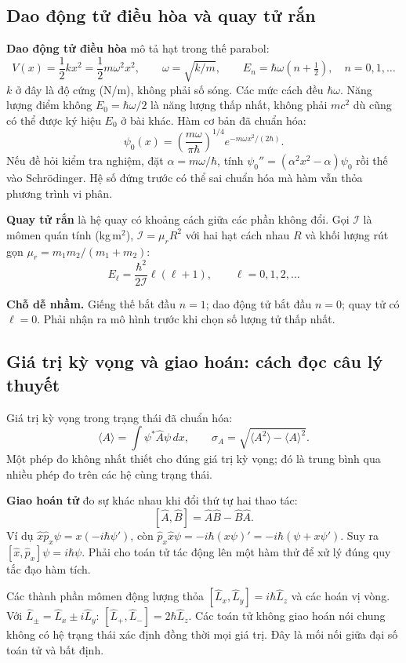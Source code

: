 \documentclass[11pt,a4paper]{article}
\newcommand{\trap}[1]{\par\textbf{Chỗ dễ nhầm.} #1\par}
\begin{document}
\subsection{Dao động tử điều hòa và quay tử rắn}\label{sec:oscrotor}
\textbf{Dao động tử điều hòa} mô tả hạt trong thế parabol:
\[
V(x)=\frac12kx^2=\frac12m\omega^2x^2,\qquad
\omega=\sqrt{k/m},\qquad E_n=\hbar\omega(n+\tfrac12),\quad n=0,1,\ldots
\]
$k$ ở đây là độ cứng (N/m), không phải số sóng.
Các mức cách đều $\hbar\omega$.
Năng lượng điểm không $E_0=\hbar\omega/2$ là năng lượng thấp nhất,
không phải $mc^2$ dù cũng có thể được ký hiệu $E_0$ ở bài khác.
Hàm cơ bản đã chuẩn hóa:
\[
\psi_0(x)=\left(\frac{m\omega}{\pi\hbar}\right)^{1/4}
e^{-m\omega x^2/(2\hbar)}.
\]
Nếu đề hỏi kiểm tra nghiệm, đặt $\alpha=m\omega/\hbar$,
tính $\psi_0''=(\alpha^2x^2-\alpha)\psi_0$ rồi thế vào Schrödinger.
Hệ số đứng trước có thể sai chuẩn hóa mà hàm vẫn thỏa phương trình vi phân.

\textbf{Quay tử rắn} là hệ quay có khoảng cách giữa các phần không đổi.
Gọi $\mathcal I$ là mômen quán tính (kg\,m$^2$), $\mathcal I=\mu_rR^2$
với hai hạt cách nhau $R$ và khối lượng rút gọn
$\mu_r=m_1m_2/(m_1+m_2)$:
\[
E_\ell=\frac{\hbar^2}{2\mathcal I}\ell(\ell+1),\qquad \ell=0,1,2,\ldots
\]
\trap{Giếng thế bắt đầu $n=1$; dao động tử bắt đầu $n=0$;
quay tử có $\ell=0$. Phải nhận ra mô hình trước khi chọn số lượng tử thấp nhất.}

\subsection{Giá trị kỳ vọng và giao hoán: cách đọc câu lý thuyết}\label{sec:commute}
Giá trị kỳ vọng trong trạng thái đã chuẩn hóa:
\[
\langle A\rangle=\int\psi^*\hat A\psi\,dx,
\qquad \sigma_A=\sqrt{\langle A^2\rangle-\langle A\rangle^2}.
\]
Một phép đo không nhất thiết cho đúng giá trị kỳ vọng;
đó là trung bình qua nhiều phép đo trên các hệ cùng trạng thái.

\textbf{Giao hoán tử} đo sự khác nhau khi đổi thứ tự hai thao tác:
\[
[\hat A,\hat B]=\hat A\hat B-\hat B\hat A.
\]
Ví dụ $\hat x\hat p_x\psi=x(-i\hbar\psi')$,
còn $\hat p_x\hat x\psi=-i\hbar(x\psi)'=-i\hbar(\psi+x\psi')$.
Suy ra $[\hat x,\hat p_x]\psi=i\hbar\psi$.
Phải cho toán tử tác động lên một hàm thử để xử lý đúng quy tắc đạo hàm tích.

Các thành phần mômen động lượng thỏa
$[\hat L_x,\hat L_y]=i\hbar\hat L_z$ và các hoán vị vòng.
Với $\hat L_\pm=\hat L_x\pm i\hat L_y$:
$[\hat L_+,\hat L_-]=2\hbar\hat L_z$.
Các toán tử không giao hoán nói chung không có hệ trạng thái xác định
đồng thời mọi giá trị. Đây là mối nối giữa đại số toán tử và bất định.
\end{document}
